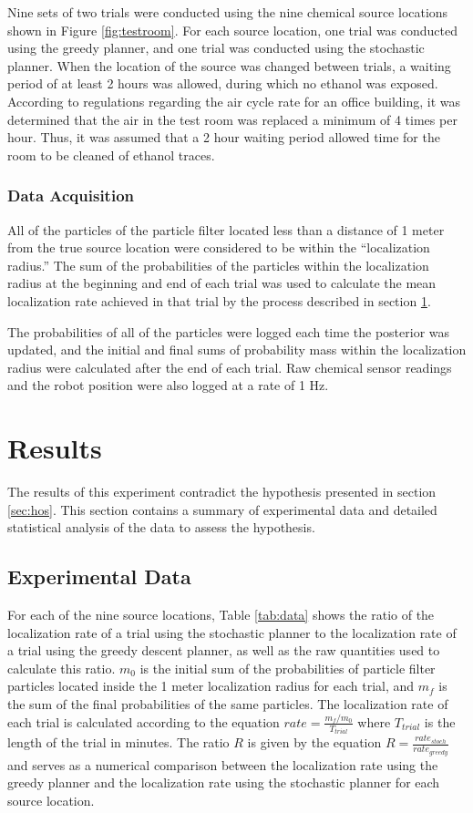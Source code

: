 \documentclass[submit, 12pt]{aiaa-pretty-modified}
\begin{document}
Nine sets of two trials were conducted using the nine chemical source locations
shown in Figure \ref{fig:testroom}. For each source location, one trial was
conducted using the greedy planner, and one trial was conducted using the
stochastic planner. When the location of the source was changed between trials,
a waiting period of at least 2 hours was allowed, during which no ethanol was
exposed. According to regulations regarding the air cycle rate for an office
building, it was determined that the air in the test room was replaced a
minimum of 4 times per hour. Thus, it was assumed that a 2 hour waiting period
allowed time for the room to be cleaned of ethanol traces.

\subsubsection{Data Acquisition}
All of the particles of the particle filter located less than a distance of 1 meter from the
true source location were considered to be within the ``localization
radius.''  The sum of the probabilities of the particles within the
localization radius at the beginning and end of each trial was used to
calculate the mean localization rate achieved in that trial by the
process described in section \ref{sec:results}.

The probabilities of all of the particles were logged each time the posterior
was updated, and the initial and final sums of probability mass within the
localization radius were calculated after the end of each trial. Raw chemical
sensor readings and the robot position were also logged at a rate of 1 Hz.

\newpage

\section{Results}
\label{sec:results}
The results of this experiment contradict the hypothesis presented in
section \ref{sec:hos}.  This section contains a summary of experimental data
and detailed statistical analysis of the data to assess the
hypothesis.

\subsection{Experimental Data}
For each of the nine source locations, Table \ref{tab:data} shows the ratio of
the localization rate of a trial using the stochastic planner to the
localization rate of a trial using the greedy descent planner, as well as the
raw quantities used to calculate this ratio. $m_0$ is the initial sum of the
probabilities of particle filter particles located inside the 1 meter
localization radius for each trial, and $m_f$ is the sum of the final
probabilities of the same particles. The localization rate of each trial is
calculated according to the equation $rate = \frac{m_f/m_0}{T_{trial}}$ where
$T_{trial}$ is the length of the trial in minutes. The ratio $R$ is given by the
equation $R = \frac{rate_{stoch}}{rate_{greedy}}$ and serves as a numerical
comparison between the localization rate using the greedy planner and the
localization rate using the stochastic planner for each source location.
\end{document}
